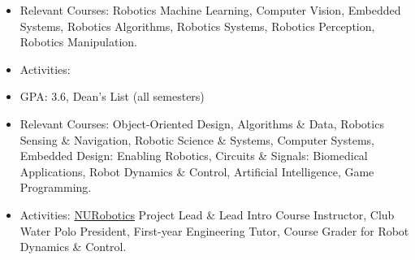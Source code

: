\documentclass[10pt,a4paper,ragged2e,withhyper]{altacv}
\newcommand{\rom}[1]{\uppercase\expandafter{\romannumeral #1\relax}}
\begin{document}
\begin{paracol}{2}
    \begin{itemize}
        \item Relevant Courses: Robotics Machine Learning, Computer Vision, Embedded Systems, Robotics Algorithms, Robotics Systems, Robotics Perception, Robotics Manipulation.
        \item Activities:
    \end{itemize}
    \begin{itemize}
        \item GPA: 3.6, Dean's List (all semesters)
        \item Relevant Courses: Object-Oriented Design, Algorithms \& Data, Robotics Sensing \& Navigation, Robotic Science \& Systems, Computer Systems, Embedded Design: Enabling Robotics, Circuits \& Signals: Biomedical Applications, Robot Dynamics \& Control, Artificial Intelligence, Game Programming.
        \item Activities: \href{https://web.northeastern.edu/nurobotics/}{NURobotics} Project Lead \& Lead Intro Course Instructor, Club Water Polo President, First-year Engineering Tutor, Course Grader for Robot Dynamics \& Control.
    \end{itemize}


\end{paracol}
\end{document}
